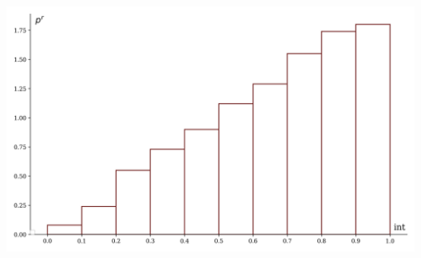\documentclass[a4paper, 14pt]{extarticle}
\begin{document}
\begin{minipage}[t]{0.25\textwidth}
\includegraphics[width=\textwidth, height=\textheight, keepaspectratio]{sample12_hist}
\end{minipage}
\end{document}
